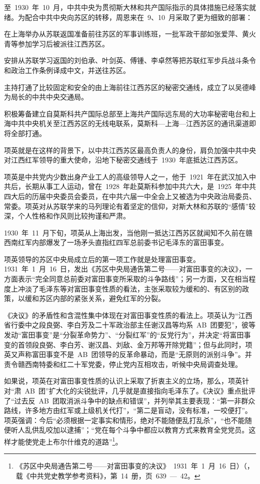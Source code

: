 至~1930~年~10~月，中共中央为贯彻斯大林和共产国际指示的具体措施已经落实就绪。为配合中共中央向苏区的转移，周恩来在~9、10~月采取了更为细致的部署：

在上海举办从苏联返国准备前往苏区的军事训练班，一批军政干部如张爱萍、黄火青等参加学习后被派往江西苏区。

安排从苏联学习返国的刘伯承、叶剑英、傅锺、李卓然等把苏联红军步兵战斗条令和政治工作条例译成中文，并送往苏区。

主持打通了比较固定和安全的由上海前往江西苏区的秘密交通线，成立了以吴德峰为局长的中共中央交通局。

积极筹备建立自莫斯科共产国际总部至上海共产国际远东局的大功率秘密电台和上海中共中央机关至江西苏区的无线电联系，莫斯科—上海—江西苏区的通讯渠道即将全部打通。

项英就是在这样的背景下，以中共江西苏区最高负责人的身份，肩负加强中共中央对江西红军领导的重大使命，沿地下秘密交通线于~1930~年底抵达江西苏区。

项英是中共党内少数出身产业工人的高级领导人之一，他于~1921~年在武汉加入中共后，长期从事工人运动，曾在~1928~年赴莫斯科参加中共六大，是~1925~年中共四大后的历届中央委员会委员，在中共六届一中全会上又被选为中央政治局委员、常委。项英对从苏联学来的马列理论有着坚定的信仰，对斯大林和苏联的“感情”较深，个人性格和作风则比较拘谨和严肃。

1930~年~11~月下旬，项英从上海出发，当他刚一抵达江西苏区就闻知不久前在赣西南红军内部爆发了一场矛头直指红四军总前委书记毛泽东的富田事变。

项英领导的苏区中央局成立后的第一项工作就是处理富田事变。1931~年~1~月~16~日，发出《苏区中央局通告第二号——对富田事变的决议》，一方面表示“完全同意总前委对富田事变所采取的斗争路线”；另一方面，又在相当程度上冲淡了毛泽东等对富田事变性质的看法，主张采取较为缓和的、有区别的政策，以缓和苏区内部的紧张关系，避免红军的分裂。

《决议》的矛盾性和含混性集中体现在对富田事变性质的看法上。项英认为“江西省行委中之段良弼、李白芳及二十军政治部主任谢汉昌等均系~AB~团要犯”，彼等发动“富田事变”是“分裂革命势力”、“分裂红军”的“反党行为”，并决定“将富田事变的首领段良弼、李白芳、谢汉昌、刘敌、金万邦等开除党籍”；但与此同时，项英又声称富田事变不是~AB~团领导的反革命暴动，而是“无原则的派别斗争”。并责令赣西南特委和红二十军党委，停止党内互相攻击，听候中央局调查处理。

如果说，项英在对富田事变性质的认识上采取了折衷主义的立场，那么，项英针对“肃~AB~团”扩大化的尖锐批评，几乎就是直接指向毛泽东了。《决议》重点批评了“过去反~AB~团取消派斗争中的缺点和错误”，并列举其主要表现：“第一非群众路线，许多地方由红军或上级机关代打”，“第二是盲动，没有标准，一咬便打”。项英强调：今后“必须根据一定事实和情形，绝对不能随便乱打乱杀”，“也不能随便听人乱供乱咬加以逮捕”；“党在每个斗争中都应以教育方式来教育全党党员。这样才能使党走上布尔什维克的道路”\footnote{《苏区中央局通告第二号——对富田事变的决议》~1931~年~1~月~16~日）（，载《中共党史教学参考资料》，第~14~册，页~639~—~42。}。

